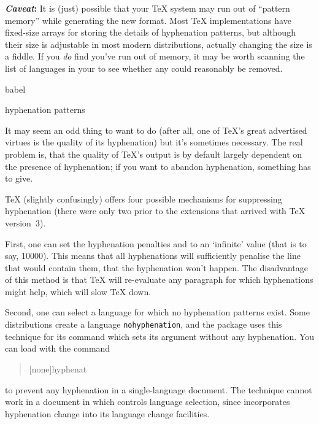 \nothtml{\noindent}\textbf{\emph{Caveat}:} It is (just) possible that
your \TeX{} system may run out of ``pattern memory'' while generating
the new format.  Most \TeX{} implementations have fixed-size arrays
for storing the details of hyphenation patterns, but although their
size is adjustable in most modern distributions, actually changing the
size is a fiddle.  If you \emph{do} find you've run out of memory,
it may be worth scanning the list of languages in your
 to see whether any could reasonably be removed.
\begin{ctanrefs}
\item[babel]
\item[hyphenation patterns]
\end{ctanrefs}


It may seem an odd thing to want to do (after all, one of \TeX{}'s
great advertised virtues is the quality of its hyphenation) but it's
sometimes necessary.  The real problem is, that the quality of
\TeX{}'s output is by default largely dependent on the presence of
hyphenation; if you want to abandon hyphenation, something has to
give.

\TeX{} (slightly confusingly) offers four possible mechanisms for
suppressing hyphenation (there were only two prior to the extensions
that arrived with \TeX{} version~3).

First, one can set the hyphenation penalties  and
 to an `infinite' value (that is to say, 10000).
This means that all hyphenations will sufficiently penalise the line
that would contain them, that the hyphenation won't happen.  The
disadvantage of this method is that \TeX{} will re-evaluate any
paragraph for which hyphenations might help, which will slow \TeX{}
down.

Second, one can select a language for which no hyphenation patterns
exist.  Some distributions create a language \texttt{nohyphenation},
and the  package uses this technique for its
 command which sets its argument without any
hyphenation.  You can load  with the command
\begin{quote}
  [none]{hyphenat}
\end{quote}
to prevent any hyphenation in a single-language document.  The
technique cannot work in a document in which  controls
language selection, since  incorporates hyphenation
change into its language change facilities.

